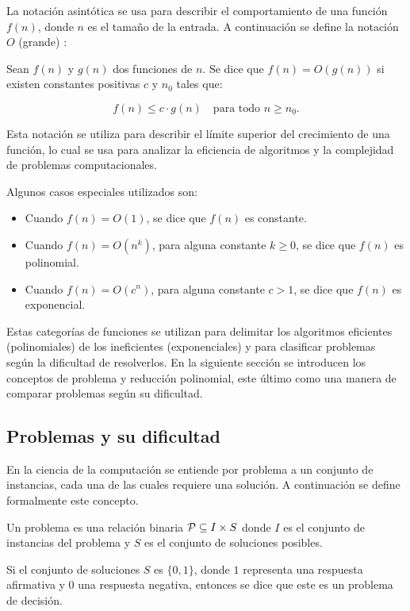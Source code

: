 La notación asintótica se usa para describir el comportamiento de una función $f(n)$, donde $n$ es el tamaño de la entrada. A continuación se define la notación $O$ (grande) \cite{Cormen2009IntroductionTA}:

\begin{definition}
	Sean $f(n)$ y $g(n)$ dos funciones de $n$. Se dice que $f(n) = O(g(n))$ si existen constantes positivas $c$ y $n_0$ tales que:

	$$
		f(n) \leq c \cdot g(n) \quad \text{para todo $n \geq n_0$}.
	$$
\end{definition}

Esta notación se utiliza para describir el límite superior del crecimiento de una función, lo cual se usa para analizar la eficiencia de algoritmos y la complejidad de problemas computacionales.

Algunos casos especiales utilizados son:
\begin{itemize}
	\item Cuando $f(n) = O(1)$, se dice que $f(n)$ es constante.
	\item Cuando $f(n) = O(n^k)$, para alguna constante $k \geq 0$, se dice que $f(n)$ es polinomial.
	\item Cuando $f(n) = O(c^n)$, para alguna constante $c > 1$, se dice que $f(n)$ es exponencial.
\end{itemize}

Estas categorías de funciones se utilizan para delimitar los algoritmos eficientes (polinomiales) de los ineficientes (exponenciales) y para clasificar problemas según la dificultad de resolverlos. En la siguiente sección se introducen los conceptos de problema y reducción polinomial, este último como una manera de comparar problemas según su dificultad.

\subsection{Problemas y su dificultad}

En la ciencia de la computación se entiende por problema a un conjunto de instancias, cada una de las cuales requiere una solución. A continuación se define formalmente este concepto.

\begin{definition}
	Un problema es una relación binaria $\mathcal{P} \subseteq I \times S$ donde $I$ es el conjunto de instancias del problema y $S$ es el conjunto de soluciones posibles.

	Si el conjunto de soluciones $S$ es $\{0, 1\}$, donde $1$ representa una respuesta afirmativa y $0$ una respuesta negativa, entonces se dice que este es un problema de decisión.
\end{definition}

